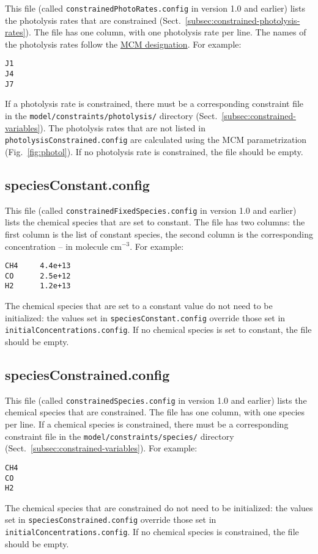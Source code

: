 This file (called \texttt{constrainedPhotoRates.config} in version 1.0
and earlier) lists the photolysis rates that are constrained
(Sect.~\ref{subsec:constrained-photolysis-rates}). The file has one column, with
one photolysis rate per line. The names of the photolysis rates follow the
\href{http://mcm.york.ac.uk/parameters/photolysis.htt}{MCM designation}.
For example:

\begin{verbatim}
J1
J4
J7
\end{verbatim}

If a photolysis rate is constrained, there must be a corresponding
constraint file in the \texttt{model/constraints/photolysis/}
directory (Sect.~\ref{subsec:constrained-variables}). The photolysis
rates that are not listed in \texttt{photolysisConstrained.config} are
calculated using the MCM parametrization (Fig.~\ref{fig:photol}). If
no photolysis rate is constrained, the file should be empty.

\subsection{speciesConstant.config} \label{subsec:speciesconstant}

This file (called \texttt{constrainedFixedSpecies.config} in version
1.0 and earlier) lists the chemical species that are set to
constant. The file has two columns: the first column is the list of
constant species, the second column is the corresponding concentration
-- in molecule cm$^{-3}$. For example:

\begin{verbatim}
CH4     4.4e+13
CO      2.5e+12
H2      1.2e+13
\end{verbatim}

The chemical species that are set to a constant value do not need to
be initialized: the values set in \texttt{speciesConstant.config}
override those set in \texttt{initialConcentrations.config}. If no
chemical species is set to constant, the file should be empty.

\subsection{speciesConstrained.config} \label{subsec:speciesconstrained}

This file (called \texttt{constrainedSpecies.config} in version 1.0
and earlier) lists the chemical species that are constrained. The file
has one column, with one species per line. If a chemical species is
constrained, there must be a corresponding constraint file in the
\texttt{model/constraints/species/} directory
(Sect.~\ref{subsec:constrained-variables}). For example:

\begin{verbatim}
CH4
CO
H2
\end{verbatim}

The chemical species that are constrained do not need to be
initialized: the values set in \texttt{speciesConstrained.config}
override those set in \texttt{initialConcentrations.config}. If no
chemical species is constrained, the file should be empty.
